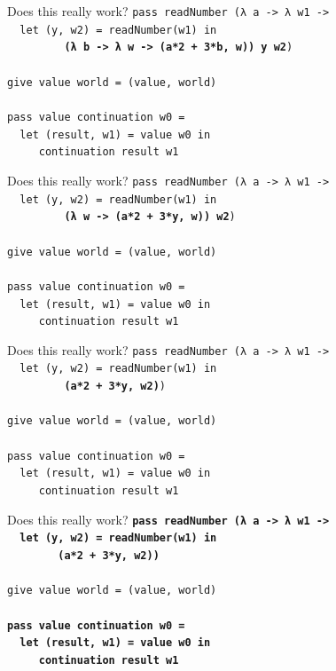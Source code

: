 \documentclass{beamer}
\begin{document}
\begin{frame}{Does this really work?}
  \texttt{pass readNumber (λ a -> λ w1 -> \\
    \ \ let (y, w2) = readNumber(w1) in\\
    \ \ \ \ \ \ \ \ \ \textbf{(λ b -> λ w -> (a*2 + 3*b, w)) y w2})\\
    \ \\
    give value world = (value, world) \\
    \ \\
    pass value continuation w0 = \\
    \ \ let (result, w1) = value w0 in \\
    \ \ \ \ \ continuation result w1
  }
\end{frame}

\begin{frame}{Does this really work?}
  \texttt{pass readNumber (λ a -> λ w1 -> \\
    \ \ let (y, w2) = readNumber(w1) in\\
    \ \ \ \ \ \ \ \ \ \textbf{(λ w -> (a*2 + 3*y, w)) w2})\\
    \ \\
    give value world = (value, world) \\
    \ \\
    pass value continuation w0 = \\
    \ \ let (result, w1) = value w0 in \\
    \ \ \ \ \ continuation result w1
  }
\end{frame}

\begin{frame}{Does this really work?}
  \texttt{pass readNumber (λ a -> λ w1 -> \\
    \ \ let (y, w2) = readNumber(w1) in\\
    \ \ \ \ \ \ \ \ \ \textbf{(a*2 + 3*y, w2)})\\
    \ \\
    give value world = (value, world) \\
    \ \\
    pass value continuation w0 = \\
    \ \ let (result, w1) = value w0 in \\
    \ \ \ \ \ continuation result w1
  }
\end{frame}

\begin{frame}{Does this really work?}
  \texttt{\textbf{pass readNumber (λ a -> λ w1 ->\\
      \ \ let (y, w2) = readNumber(w1) in\\
      \ \ \ \ \ \ \ \ (a*2 + 3*y, w2))}\\
    \ \\
    give value world = (value, world) \\
    \ \\
    \textbf{pass value continuation w0 = \\
      \ \ let (result, w1) = value w0 in \\
      \ \ \ \ \ continuation result w1}
  }
\end{frame}
\end{document}
